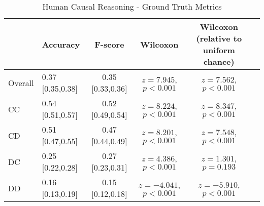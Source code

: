 \begin{table}
\caption{Human Causal Reasoning - Ground Truth Metrics}
\label{summary_performance}
\begin{tabular}{llcccc}
\toprule
 & Accuracy & F-score & Wilcoxon & Wilcoxon (relative to uniform chance) \\
\midrule
Overall & 0.37 [0.35,0.38] & 0.35 [0.33,0.36] & $z = 7.945$, $p < 0.001$ & $z = 7.562$, $p < 0.001$ \\
CC & 0.54 [0.51,0.57] & 0.52 [0.49,0.54] & $z = 8.224$, $p < 0.001$ & $z = 8.347$, $p < 0.001$ \\
CD & 0.51 [0.47,0.55] & 0.47 [0.44,0.49] & $z = 8.201$, $p < 0.001$ & $z = 7.548$, $p < 0.001$ \\
DC & 0.25 [0.22,0.28] & 0.27 [0.23,0.31] & $z = 4.386$, $p < 0.001$ & $z = 1.301$, $p = 0.193$ \\
DD & 0.16 [0.13,0.19] & 0.15 [0.12,0.18] & $z = -4.041$, $p < 0.001$ & $z = -5.910$, $p < 0.001$ \\
\bottomrule
\end{tabular}
\end{table}
